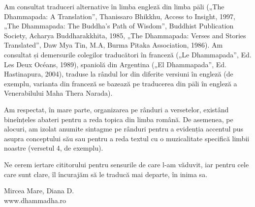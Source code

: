 Am consultat traduceri alternative în limba engleză din limba pāli („The Dhammapada: A Translation”, Thanissaro Bhikkhu, Access to Insight, 1997, „The Dhammapada: The Buddha's Path of Wisdom”, Buddhist Publication Society, Acharya Buddharakkhita, 1985, „The Dhammapada: Verses and Stories Translated”, Daw Mya Tin, M.A, Burma Pitaka Association, 1986). Am consultat și demersurile colegilor traducători în franceză („Le Dhammapada”, Ed. Les Deux Océans, 1989), spaniolă din Argentina („El Dhammapada”, Ed. Hastinapura, 2004), traduse la rândul lor din diferite versiuni în engleză (de exemplu, varianta din franceză se bazează pe traducerea din pāli în engleză a Venerabilului Maha Thera Narada).

Am respectat, în mare parte, organizarea pe rânduri a versetelor, existând bineînțeles abateri pentru a reda topica din limba română. De asemenea, pe alocuri, am izolat anumite sintagme pe rânduri pentru a evidenția accentul pus asupra conceptului său sau pentru a reda textul cu o
muzicalitate specifică limbii noastre (versetul 4, de exemplu).

Ne cerem iertare cititorului pentru sensurile de care l-am văduvit, iar pentru cele care sunt clare, îl încurajăm să le traducă mai departe, în inima sa.

\bigskip

{\raggedleft
Mircea Mare, Diana D.\\
www.dhammadha.ro
\par}
